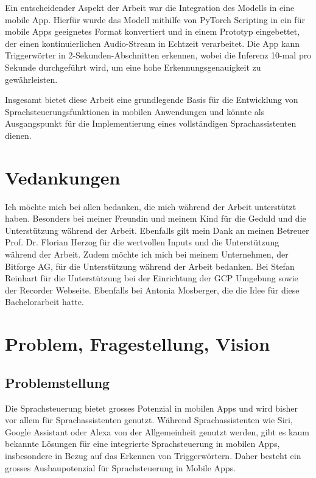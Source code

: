 \documentclass[11pt,a4paper]{article}
\begin{document}
\noindent \newline
Ein entscheidender Aspekt der Arbeit war die Integration des Modells in eine mobile App. Hierfür wurde 
das Modell mithilfe von PyTorch Scripting in ein für mobile Apps geeignetes Format konvertiert und 
in einem Prototyp eingebettet, der einen kontinuierlichen Audio-Stream in Echtzeit verarbeitet. Die 
App kann Triggerwörter in 2-Sekunden-Abschnitten erkennen, wobei die Inferenz 10-mal pro 
Sekunde durchgeführt wird, um eine hohe Erkennungsgenauigkeit zu gewährleisten.

\noindent \newline
Insgesamt bietet diese Arbeit eine grundlegende Basis für die Entwicklung von 
Sprachsteuerungsfunktionen in mobilen Anwendungen und könnte als Ausgangspunkt für die Implementierung eines vollständigen Sprachassistenten dienen.


\section*{Vedankungen}
Ich möchte mich bei allen bedanken, die mich während der Arbeit unterstützt haben. Besonders bei 
meiner Freundin und meinem Kind für die Geduld und die Unterstützung während der Arbeit. Ebenfalls 
gilt mein Dank an meinen Betreuer Prof. Dr. Florian Herzog für die wertvollen Inputs und die 
Unterstützung während der Arbeit. Zudem möchte ich mich bei meinem Unternehmen, der Bitforge AG, 
für die Unterstützung während der Arbeit bedanken. Bei Stefan Reinhart für die Unterstützung bei 
der Einrichtung der GCP Umgebung sowie der Recorder Webseite. Ebenfalls bei Antonia 
Mosberger, die die Idee für diese Bachelorarbeit hatte.


\newpage
{}
\tableofcontents
{}
\newpage


\newpage \section{Problem, Fragestellung, Vision}
\subsection{Problemstellung}
Die Sprachsteuerung bietet grosses Potenzial in mobilen Apps und wird bisher vor allem für 
Sprachassistenten genutzt. Während Sprachassistenten wie Siri, Google Assistant oder Alexa 
von der Allgemeinheit genutzt werden, gibt es kaum bekannte Lösungen für eine integrierte 
Sprachsteuerung in mobilen Apps, insbesondere in Bezug auf das Erkennen von Triggerwörtern. Daher 
besteht ein grosses Ausbaupotenzial für 
Sprachsteuerung in Mobile Apps. 
\end{document}
